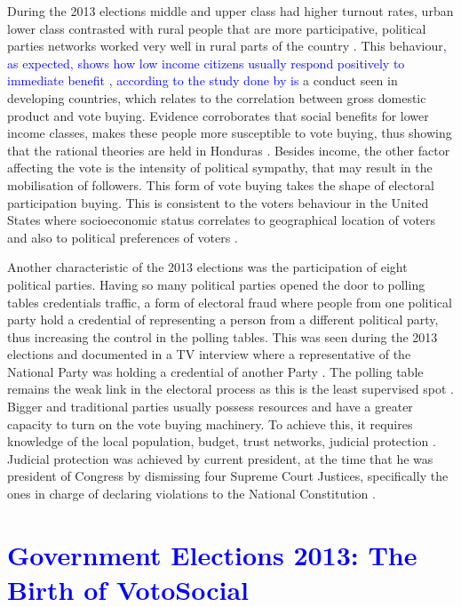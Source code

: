 \documentclass[letterpaper,10pt]{article}
\begin{document}
During the 2013 elections middle and upper class had higher turnout rates, urban lower class contrasted with rural people that are more participative, political parties networks worked very well in rural parts of the country \citep{romero2014}. This behaviour\textcolor{blue}{, as expected, shows how low income citizens usually respond positively to immediate benefit \citep{kit2000}, according to the study done by \cite{gonza2014} is} a conduct seen in developing countries, which relates to the correlation between gross domestic product and vote buying. Evidence corroborates that social benefits for lower income classes, makes these people more susceptible to vote buying, thus showing that the rational theories are held in Honduras \citep{gonza2014}. Besides income, the other factor affecting the vote is the intensity of political sympathy, that may result in the mobilisation of followers. This form of vote buying takes the shape of electoral participation buying. This is consistent to the voters behaviour in the United States where socioeconomic status correlates to geographical location of voters and also to political preferences of voters \citep{osborn2010}.

Another characteristic of the 2013 elections was the participation of eight political parties. Having so many political parties opened the door to polling tables credentials traffic, a form of electoral fraud where people from one political party hold a credential of representing a person from a different political party, thus increasing the control in the polling tables. This was seen during the 2013 elections and documented in a TV interview where a representative of the National Party was holding a credential of another Party \citep{vidap}. The polling table remains the weak link in the electoral process as this is the least supervised spot \citep{romero2014}. Bigger and traditional parties usually possess resources and have a greater capacity to turn on the vote buying machinery. To achieve this, it requires knowledge of the local population, budget, trust networks, judicial protection \citep{gonza2014}. Judicial protection was achieved by current president, at the time that he was president of Congress by dismissing four Supreme Court Justices, specifically the ones in charge of declaring violations to the National Constitution \citep{csj2012}.


\section{\textcolor{blue}{Government Elections 2013: The Birth of VotoSocial}}
\end{document}

